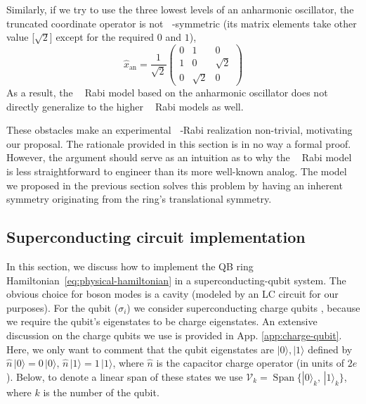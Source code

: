 \documentclass[reprint, aps, prx, amsmath, amssymb, longbibliography, superscriptaddress]{revtex4-2}
\DeclareMathOperator{\Zn}{\mathbb{Z}_n}
\DeclareMathOperator{\Zthree}{\mathbb{Z}_3}
\DeclareMathOperator{\Ztwo}{\mathbb{Z}_2}
\begin{document}
Similarly, if we try to use the three lowest levels of an anharmonic oscillator, the truncated coordinate operator is
not $\Zthree$-symmetric (its matrix elements take other value [$\sqrt{2}$] except for the required $0$ and $1$),
\begin{equation}
    \hat x_{\text{an}} = \frac{1}{\sqrt{2}}\begin{pmatrix} 0 & 1 & 0 \\ 1 & 0 & \sqrt{2} \\ 0 & \sqrt{2} & 0 \end{pmatrix}
\end{equation}
As a result, the $\Ztwo$ Rabi model based on the anharmonic oscillator does not directly generalize to the higher $\Zn$ Rabi models as well.

These obstacles make an experimental $\Zn$‑Rabi realization non-trivial, motivating our proposal. The rationale provided in this section is in no way a formal proof. However, the argument should serve as an intuition as to why the $\Zthree$ Rabi model is less straightforward to engineer than its more well-known analog. The model we proposed in the previous section solves this problem by having an inherent $\Zthree$ symmetry originating from the ring's translational symmetry.

\subsection{Superconducting circuit implementation}
\label{sec:superconducting-implementation}

In this section, we discuss how to implement the QB ring Hamiltonian~\eqref{eq:physical-hamiltonian} in a superconducting-qubit system. The obvious choice for boson modes is a cavity (modeled by an LC circuit for our purposes). For the qubit ($\sigma_i$)  we consider superconducting charge qubits \cite{bouchiat_quantum_1998,nakamura_coherent_1999,lehnert_measurement_2003,makhlin_quantumstate_2001}, because we require the qubit's eigenstates to be charge eigenstates. An extensive discussion on the charge qubits we use is provided in App. \ref{app:charge-qubit}. Here, we only want to comment that the qubit eigenstates are $|0\rangle, |1\rangle$ defined by $\hat n\, |0\rangle = 0\, |0\rangle, \, \hat n \,|1\rangle = 1\,|1\rangle$, where $\hat n$ is the capacitor charge operator (in units of $2e$). Below, to denote a linear span of these states we use $\mathcal{V}_k = \operatorname{Span}\{|0\rangle_k, \, |1\rangle_k\}$, where $k$ is the number of the qubit.
\end{document}
